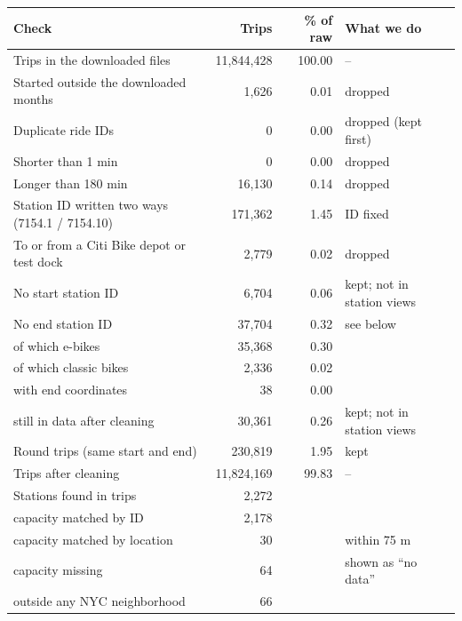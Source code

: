 \begin{tabular}{lrrl}
\toprule
\textbf{Check} & \textbf{Trips} & \textbf{\% of raw} & \textbf{What we do} \\
\midrule
Trips in the downloaded files & 11,844,428 & 100.00 & -- \\
Started outside the downloaded months & 1,626 & 0.01 & dropped \\
Duplicate ride IDs & 0 & 0.00 & dropped (kept first) \\
Shorter than 1 min & 0 & 0.00 & dropped \\
Longer than 180 min & 16,130 & 0.14 & dropped \\
Station ID written two ways (7154.1 / 7154.10) & 171,362 & 1.45 & ID fixed \\
To or from a Citi Bike depot or test dock & 2,779 & 0.02 & dropped \\
No start station ID & 6,704 & 0.06 & kept; not in station views \\
No end station ID & 37,704 & 0.32 & see below \\
\quad of which e-bikes & 35,368 & 0.30 &  \\
\quad of which classic bikes & 2,336 & 0.02 &  \\
\quad with end coordinates & 38 & 0.00 &  \\
\quad still in data after cleaning & 30,361 & 0.26 & kept; not in station views \\
Round trips (same start and end) & 230,819 & 1.95 & kept \\
Trips after cleaning & 11,824,169 & 99.83 & -- \\
\midrule
Stations found in trips & 2,272 & & \\
\quad capacity matched by ID & 2,178 & & \\
\quad capacity matched by location & 30 & & within 75 m \\
\quad capacity missing & 64 & & shown as ``no data'' \\
\quad outside any NYC neighborhood & 66 & & \\
\bottomrule
\end{tabular}
